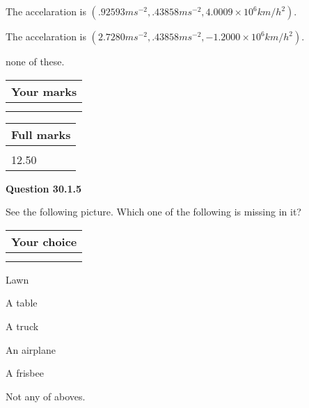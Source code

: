 \documentclass[12pt]{article}
\begin{document}
 
The accelaration is
$(
.92593ms^{-2},
.43858ms^{-2},
4.0009 \times 10^{6}km/h^2
).
$
 
 
The accelaration is
$(
2.7280ms^{-2},
.43858ms^{-2},
-1.2000 \times 10^{6}km/h^2
).
$
 
 
none of these.
 
 
 
 

 
\vspace{0.3in}
  
\vspace{0.2in}
  
         \begin{tabular}{|l|}
\hline
 Your marks  \\
\hline
 \\ 
 \\ 
\hline
\end{tabular}
\hspace{0.05in} \begin{tabular}{|l|}
\hline
 Full marks  \\
\hline
 \\ 
12.50 \\
\hline
\end{tabular}
{\textbf{\Large{Question
30.1.5 
}}}
  
  
See the following picture.
Which one of the following is missing in it?
  
  
\noindent\hspace{3.0in} \begin{tabular}{|l|}
\hline
Your choice \\
\hline
 \\ 
 \\ 
\hline
\end{tabular}
  
  
 
 
Lawn
 
 
A table
 
 
A truck
 
 
An airplane
 
 
A frisbee
 
 
  Not any of aboves.
 
 
 
\vspace{0.3in}
  
\end{document}
